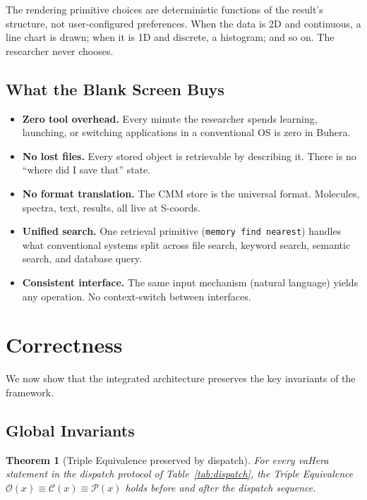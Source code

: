 \documentclass[11pt,twocolumn,a4paper]{article}
\newtheorem{theorem}{Theorem}[section]
\begin{document}
The rendering primitive choices are deterministic functions of the result's structure, not user-configured preferences. When the data is 2D and continuous, a line chart is drawn; when it is 1D and discrete, a histogram; and so on. The researcher never chooses.

\subsection{What the Blank Screen Buys}

\begin{itemize}[leftmargin=*]
\item \textbf{Zero tool overhead.} Every minute the researcher spends learning, launching, or switching applications in a conventional OS is zero in Buhera.
\item \textbf{No lost files.} Every stored object is retrievable by describing it. There is no ``where did I save that'' state.
\item \textbf{No format translation.} The CMM store is the universal format. Molecules, spectra, text, results, all live at S-coords.
\item \textbf{Unified search.} One retrieval primitive (\texttt{memory find nearest}) handles what conventional systems split across file search, keyword search, semantic search, and database query.
\item \textbf{Consistent interface.} The same input mechanism (natural language) yields any operation. No context-switch between interfaces.
\end{itemize}


\section{Correctness}
\label{sec:correctness}

We now show that the integrated architecture preserves the key invariants of the framework.

\subsection{Global Invariants}

\begin{theorem}[Triple Equivalence preserved by dispatch]
\label{thm:triple_preserved}
For every vaHera statement in the dispatch protocol of Table~\ref{tab:dispatch}, the Triple Equivalence $\mathcal{O}(x) \equiv \mathcal{C}(x) \equiv \mathcal{P}(x)$ holds before and after the dispatch sequence.
\end{theorem}
\end{document}
